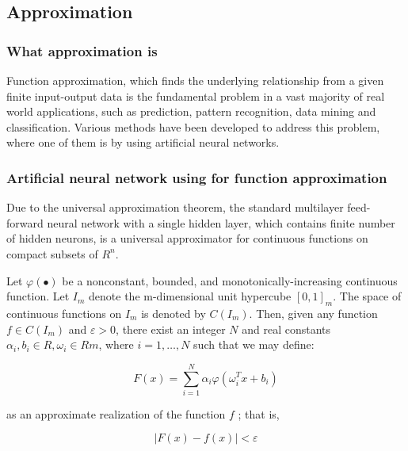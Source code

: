 \documentclass[a4paper,12pt]{article}
\begin{document}
\subsection{Approximation}
\subsubsection{What approximation is}

Function approximation, which finds the underlying relationship from a given finite input-output data is the fundamental problem in a vast majority of real world applications, such as prediction, pattern recognition, data mining and classification. Various methods have been developed to address this problem, where one of them is by using artificial neural networks.

\subsubsection{Artificial neural network using for function approximation}

Due to the universal approximation theorem, the standard multilayer feed-forward neural network with a single hidden layer, which contains finite number of hidden neurons, is a universal approximator for continuous functions on compact subsets of $R^n$.

Let $\varphi(\bullet) $ be a nonconstant, bounded, and monotonically-increasing continuous function. Let $I_m$ denote the m-dimensional unit hypercube $ [0,1]_m. $ The space of continuous functions on $ I_m $ is denoted by $C(I_m)$. Then, given any function $ f \in C(I_m) $ and $ \varepsilon > 0 $, there exist an integer $ N $ and real constants $ \alpha_i, b_i \in R, \omega_i \in Rm $, where $ i = 1, \hdots, N $ such that we may define:

\begin{equation}
 F(x) = \sum\limits_{i=1}^N\alpha_i\varphi(\omega_i^Tx+b_i) 
\end{equation}

as an approximate realization of the function $ f $ ; that is,

\begin{equation}
 |F(x)-f(x)|<\varepsilon
\end{equation}
\end{document}
